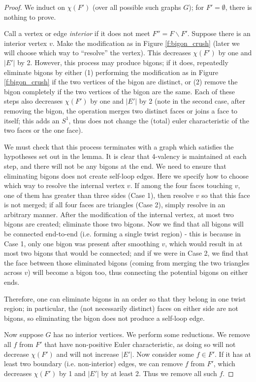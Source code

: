 \documentclass[11pt]{amsart}
\theoremstyle{plain}
\theoremstyle{definition}
\begin{document}
\begin{proof}
We induct on $\chi(F')$ (over all possible such graphs $G$);
for $F' = \emptyset$, there is nothing to prove.

Call a vertex or edge \emph{interior} if it does not meet
$F'' = F \backslash F'$.
Suppose there is an interior vertex $v$.
Make the modification as in Figure \ref{f:bigon_crush}
(later we will choose which way to ``resolve'' the vertex).
This decreases $\chi(F')$ by one and $|E'|$ by 2.
However, this process may produce bigons;
if it does, repeatedly eliminate bigons by either
(1) performing the modification as in Figure \ref{f:bigon_crush}
if the two vertices of the bigon are distinct,
or (2) remove the bigon completely if the two vertices
of the bigon are the same.
Each of these steps also decreases $\chi(F')$ by one and $|E'|$ by 2
(note in the second case, after removing the bigon,
the operation merges two distinct faces or joins a face to itself;
this adds an $S^1$, thus does not change the (total) euler characteristic
of the two faces or the one face).


We must check that this process terminates with a graph
which satisfies the hypotheses set out in the lemma.
It is clear that %
4-valency is maintained
at each step, and there will not be any bigons at the end.
We need to ensure that eliminating bigons does not
create self-loop edges.
Here we specify how to choose which way to resolve the internal
vertex $v$. If among the four faces touching $v$,
one of them has greater than three sides (Case 1),
then resolve $v$ so that this face is not merged;
if all four faces are triangles (Case 2),
simply resolve in an arbitrary manner.
After the modification of the internal vertex,
at most two bigons are created;
eliminate those two bigons.
Now we find that all bigons will be connected end-to-end
(i.e. forming a single twist region) -
this is because in Case 1, only one bigon was present after smoothing
$v$, which would result in at most two bigons that would be connected;
and if we were in Case 2, we find that the face between those
eliminated bigons (coming from merging the two triangles across $v$)
will become a bigon too,
thus connecting the potential bigons on either ends.

Therefore, one can eliminate bigons in an order so that
they belong in one twist region;
in particular, the (not necessarily distinct) faces on either side
are not bigons,
so eliminating the bigon does not produce a self-loop edge.


Now suppose $G$ has no interior vertices.
We perform some reductions.
We remove all $f$ from $F'$ that have non-positive Euler characteristic,
as doing so will not decrease $\chi(F')$ and will not increase $|E'|$.
Now consider some $f\in F'$.
If it has at least two boundary (i.e. non-interior) edges,
we can remove $f$ from $F'$,
which decreases $\chi(F')$ by 1 and $|E'|$ by at least 2.
Thus we remove all such $f$.



\end{proof}
\end{document}
